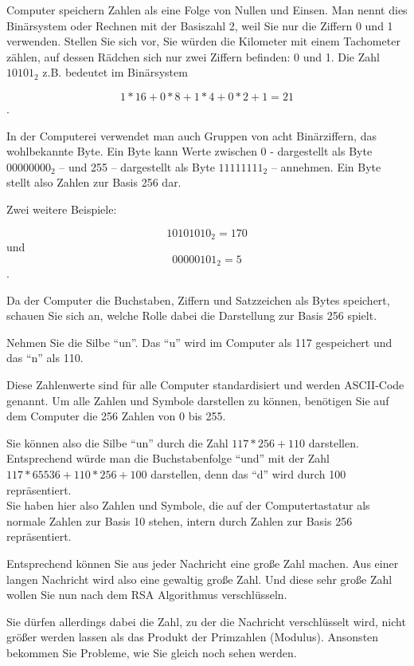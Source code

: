 \documentclass[a4paper,11pt, oneside,openright,titlepage,dvips]{scrbook}
\begin{document}
\clearpage

Computer speichern Zahlen als eine Folge von Nullen und Einsen.
Man nennt dies Binärsystem oder Rechnen mit der Basiszahl 2,
weil Sie nur die Ziffern 0 und 1 verwenden. Stellen Sie sich vor,
Sie würden die Kilometer mit einem Tachometer zählen, auf
dessen Rädchen sich nur zwei Ziffern befinden: 0 und 1.
Die Zahl $10101_2$ z.B. bedeutet im Binärsystem

\[ 1 * 16 + 0 * 8 + 1 * 4 + 0 * 2 + 1 = 21 \].

In der Computerei verwendet man auch Gruppen von acht Binärziffern,
das wohlbekannte Byte. Ein Byte kann Werte zwischen 0 - dargestellt
als Byte $00000000_2$ -- und 255 -- dargestellt als Byte
$11111111_2$ -- annehmen. Ein Byte stellt also Zahlen zur Basis 256
dar.

Zwei weitere Beispiele:

\[ 10101010_2 = 170 \] und
\[ 00000101_2 = 5 \].

Da der Computer die Buchstaben, Ziffern und Satzzeichen als Bytes
speichert, schauen Sie sich an, welche Rolle dabei die Darstellung zur
Basis 256 spielt.


\clearpage
Nehmen Sie die Silbe "`un"'. Das "`u"' wird im Computer als 117
gespeichert und das "`n"' als 110.

Diese Zahlenwerte sind für alle Computer standardisiert und werden
ASCII-Code genannt. Um alle Zahlen und Symbole darstellen zu können,
benötigen Sie auf dem Computer die 256 Zahlen von 0 bis 255.

Sie können also die Silbe "`un"' durch die Zahl $117 * 256 + 110$
darstellen.\\
Entsprechend würde man die Buchstabenfolge "`und"' mit der Zahl $117 *
65536 + 110 * 256 + 100$ darstellen, denn das "`d"' wird
durch 100 repräsentiert.\\
Sie haben hier also Zahlen und Symbole, die auf der Computertastatur
als normale Zahlen zur Basis 10 stehen, intern durch Zahlen zur Basis
256 repräsentiert.

Entsprechend können Sie aus jeder Nachricht eine große Zahl machen.
Aus einer langen Nachricht wird also eine gewaltig große Zahl. Und
diese sehr große Zahl wollen Sie nun nach dem RSA Algorithmus
verschlüsseln.

Sie dürfen allerdings dabei die Zahl, zu der die Nachricht
verschlüsselt wird, nicht größer werden lassen als das Produkt der
Primzahlen (Modulus). Ansonsten bekommen Sie Probleme, wie Sie gleich
noch sehen werden.
\end{document}
